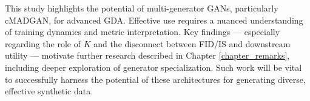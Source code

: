 This study highlights the potential of multi-generator GANs, particularly cMADGAN, for advanced GDA. Effective use requires a nuanced understanding of training dynamics and metric interpretation. Key findings --- especially regarding the role of \(K\) and the disconnect between FID/IS and downstream utility --- motivate further research described in Chapter \ref{chapter_remarks}, including deeper exploration of generator specialization. Such work will be vital to successfully harness the potential of these architectures for generating diverse, effective synthetic data.



%




